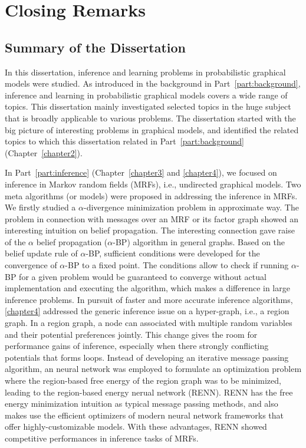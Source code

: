\chapter{Closing Remarks}
\label{chapter9}

\section{Summary of the Dissertation}
In this dissertation, inference and learning problems in probabilistic graphical models were studied. As introduced in the background in Part~\ref{part:background}, inference and learning in probabilistic graphical models covers a wide range of topics. This dissertation mainly investigated selected topics in the huge subject that is broadly applicable to various problems. The dissertation started with the big picture of interesting problems in graphical models, and identified the related topics to which this dissertation related in Part~\ref{part:background} (Chapter~\ref{chapter2}).

In Part~\ref{part:inference} (Chapter~\ref{chapter3} and \ref{chapter4}), we focused on inference in Markov random fields (MRFs), i.e., undirected graphical models. Two meta algorithms (or models) were proposed in addressing the inference in MRFs. We firstly studied a $\alpha$-divergence minimization problem in approximate way. The problem in connection with messages over an MRF or its factor graph showed an interesting intuition on belief propagation. The interesting connection gave raise of the $\alpha$ belief propagation ($\alpha$-BP) algorithm in general graphs. Based on the belief update rule of $\alpha$-BP, sufficient conditions were developed for the convergence of $\alpha$-BP to a fixed point. The conditions allow to check if running $\alpha$-BP for a given problem would be guaranteed to converge without actual implementation and executing the algorithm, which makes a difference in large inference problems. In pursuit of faster and more accurate inference algorithms, \ref{chapter4} addressed the generic inference issue on a hyper-graph, i.e., a region graph. In a region graph, a node can associated with multiple random variables and their potential preferences jointly. This change gives the room for performance gains of inference, especially when there strongly conflicting potentials that forms loops. Instead of developing an iterative message passing algorithm, an neural network was employed to formulate an optimization problem where the region-based free energy of the region graph was to be minimized, leading to the region-based energy nerual network (RENN). RENN has the free energy minimization intuition as typical message passing methods, and also makes use the efficient optimizers of modern neural network frameworks that offer highly-customizable models. With these advantages, RENN showed competitive performances in inference tasks of MRFs.

